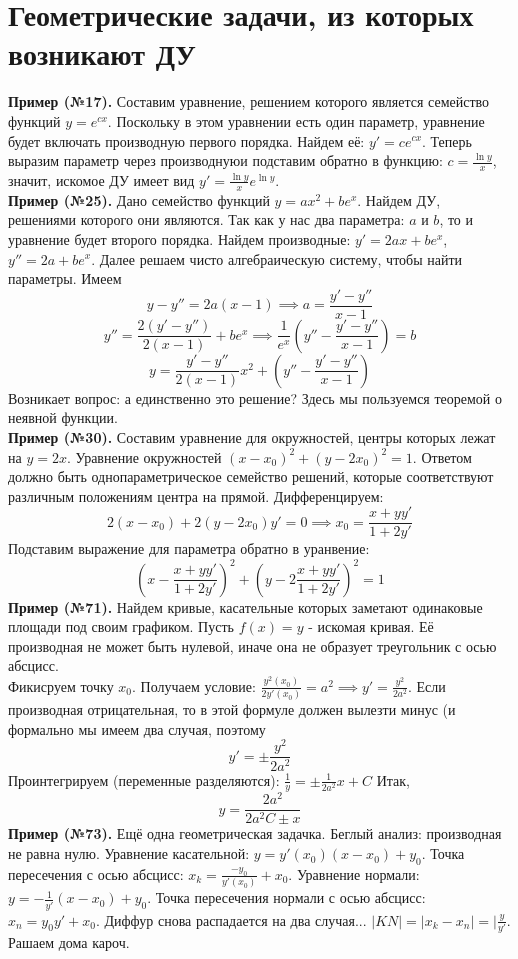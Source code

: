 \section{Геометрические задачи, из которых возникают ДУ}
\textbf{Пример (№17).} Составим уравнение, решением которого является семейство
функций $y=e^{cx}$. Поскольку в этом уравнении есть один параметр, уравнение
будет включать производную первого порядка. Найдем её: $y'=ce^{cx}$. Теперь
выразим параметр через производнуюи подставим обратно в функцию:
$c=\frac{\ln{y}}{x}$, значит, искомое ДУ имеет вид
$y'=\frac{\ln{y}}{x}e^{\ln{y}}$.\\
\textbf{Пример (№25).} Дано семейство функций $y=ax^2+be^x$. Найдем ДУ,
решениями которого они являются. Так как у нас два 
параметра: $a$ и  $b$, то и уравнение будет второго порядка. Найдем 
производные: $y'=2ax+be^x$, $y''=2a+be^x$. Далее решаем чисто алгебраическую 
систему, чтобы найти параметры. Имеем
$$y-y''=2a(x-1)\implies a=\frac{y'-y''}{x-1}$$ 
$$y''=\frac{2(y'-y'')}{2(x-1)}+be^x\implies \frac{1}{e^x}\left(y''-
\frac{y'-y''}{x-1}\right)=b$$ 
$$y=\frac{y'-y''}{2(x-1)}x^2+\left(y''-\frac{y'-y''}{x-1}\right)$$
Возникает вопрос: а единственно это решение? Здесь мы пользуемся теоремой о 
неявной функции.\\
\textbf{Пример (№30).} Составим уравнение для окружностей, центры которых 
лежат на $y=2x$. Уравнение окружностей  $(x-x_0)^2+(y-2x_0)^2=1$. Ответом 
должно быть однопараметрическое семейство решений, которые соответствуют 
различным положениям центра на прямой. Дифференцируем:
$$2(x-x_0)+2(y-2x_0)y'=0\implies x_0=\frac{x+yy'}{1+2y'}$$
Подставим выражение для параметра обратно в уранвение:
$$\left(x-\frac{x+yy'}{1+2y'}\right)^2+\left(y-2\frac{x+yy'}{1+2y'}\right)^2=
1$$
\textbf{Пример (№71).} Найдем кривые, касательные которых заметают 
одинаковые площади под своим графиком. Пусть $f(x)=y$ - искомая кривая. 
Её производная не может быть нулевой, иначе она не образует треугольник
с осью абсцисс. \\
Фикисруем точку  $x_0$.  Получаем условие: $\frac{y^2(x_0)}{2y'(x_0)}=a^2
\implies y'=\frac{y^2}{2a^2}$. Если производная отрицательная, то в этой 
формуле должен вылезти минус (и формально мы имеем два случая, поэтому 
$$y'=\pm\frac{y^2}{2a^2}$$
Проинтегрируем (переменные разделяются):
$\frac{1}{y}=\pm \frac{1}{2a^2}x+C$
Итак, $$y=\frac{2a^2}{2a^2C\pm x}$$
\textbf{Пример (№73).} Ещё одна геометрическая задачка. Беглый анализ: 
производная не равна нулю. Уравнение касательной: $y=y'(x_0)(x-x_0)+y_0$.
Точка пересечения с осью абсцисс: $x_k=\frac{-y_0}{y'(x_0)}+x_0$.
Уравнение нормали: $y=-\frac{1}{y'}(x-x_0)+y_0$. Точка пересечения нормали с
осью абсцисс: $x_n=y_0y'+x_0$. Диффур снова распадается на два случая...
$|KN|=|x_k-x_n|=|\frac{y}{y'}$. Рашаем дома кароч. 
